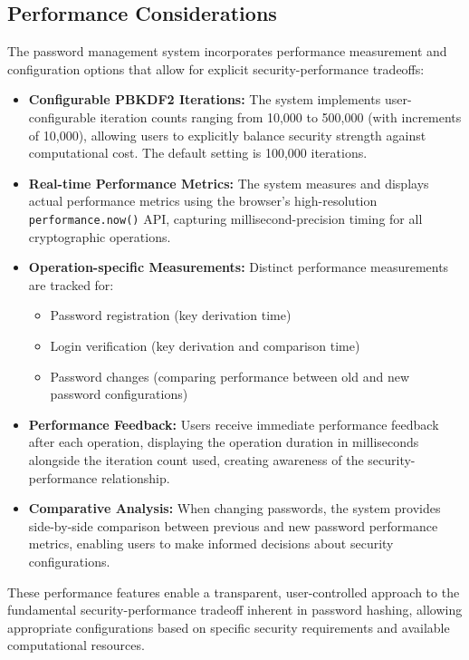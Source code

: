 \documentclass[11pt,a4paper]{article}
\begin{document}
\subsection{Performance Considerations}

The password management system incorporates performance measurement and configuration options that allow for explicit security-performance tradeoffs:

\begin{itemize}
    \item \textbf{Configurable PBKDF2 Iterations:} The system implements user-configurable iteration counts ranging from 10,000 to 500,000 (with increments of 10,000), allowing users to explicitly balance security strength against computational cost. The default setting is 100,000 iterations.
    
    \item \textbf{Real-time Performance Metrics:} The system measures and displays actual performance metrics using the browser's high-resolution \texttt{performance.now()} API, capturing millisecond-precision timing for all cryptographic operations.
    
    \item \textbf{Operation-specific Measurements:} Distinct performance measurements are tracked for:
    \begin{itemize}
        \item Password registration (key derivation time)
        \item Login verification (key derivation and comparison time)
        \item Password changes (comparing performance between old and new password configurations)
    \end{itemize}
    
    \item \textbf{Performance Feedback:} Users receive immediate performance feedback after each operation, displaying the operation duration in milliseconds alongside the iteration count used, creating awareness of the security-performance relationship.
    
    \item \textbf{Comparative Analysis:} When changing passwords, the system provides side-by-side comparison between previous and new password performance metrics, enabling users to make informed decisions about security configurations.
\end{itemize}

These performance features enable a transparent, user-controlled approach to the fundamental security-performance tradeoff inherent in password hashing, allowing appropriate configurations based on specific security requirements and available computational resources.
\end{document}

